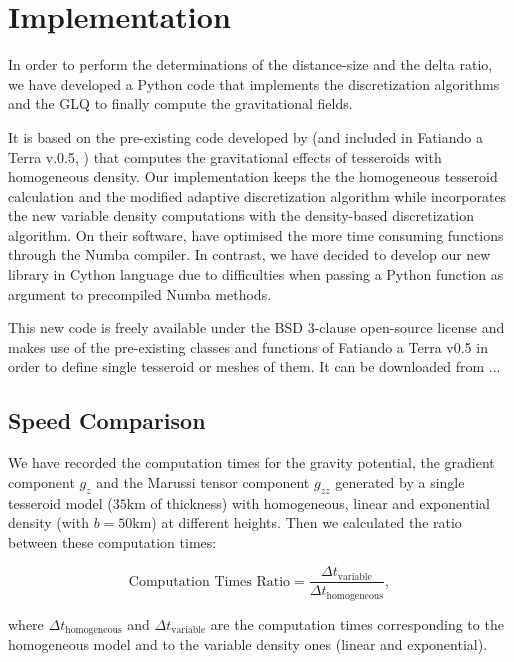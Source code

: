 \documentclass[extra]{gji}
\begin{document}
\section{Implementation}

In order to perform the determinations of the distance-size and the
delta ratio, we have developed a Python code that implements the
discretization algorithms and the GLQ to finally compute the
gravitational fields.

It is based on the pre-existing code developed by \citet{Uieda2016} (and
included in Fatiando a Terra v.0.5, \citet{Uieda2013}) that computes
the gravitational effects of tesseroids with homogeneous density.
Our implementation keeps the the homogeneous tesseroid calculation and
the modified adaptive discretization algorithm while incorporates the
new variable density computations with the density-based discretization
algorithm.
On their software, \citet{Uieda2016} have optimised the more time
consuming functions through the Numba compiler.
In contrast, we have decided to develop our new library in Cython
language due to difficulties when passing a Python function as argument
to precompiled Numba methods.

This new code is freely available under the BSD 3-clause open-source
license and makes use of the pre-existing classes and functions of
Fatiando a Terra v0.5 in order to define single tesseroid or meshes of
them.
It can be downloaded from ...


\subsection{Speed Comparison}

We have recorded the computation times for the gravity potential, the gradient component $g_z$ and the Marussi tensor component $g_{zz}$ generated by a single tesseroid model ($35$km of thickness) with homogeneous, linear and exponential density (with $b=50$km) at different heights. Then we calculated the ratio between these computation times:

\begin{equation}
    \text{Computation Times Ratio} =
        \frac{\Delta t_\text{variable}}{\Delta t_\text{homogeneous}},
    \label{eq:computation-times-ratio}
\end{equation}

\noindent where $\Delta t_\text{homogeneous}$ and $\Delta t_\text{variable}$ are the computation times corresponding to the homogeneous model and to the variable density ones (linear and exponential).
\end{document}
